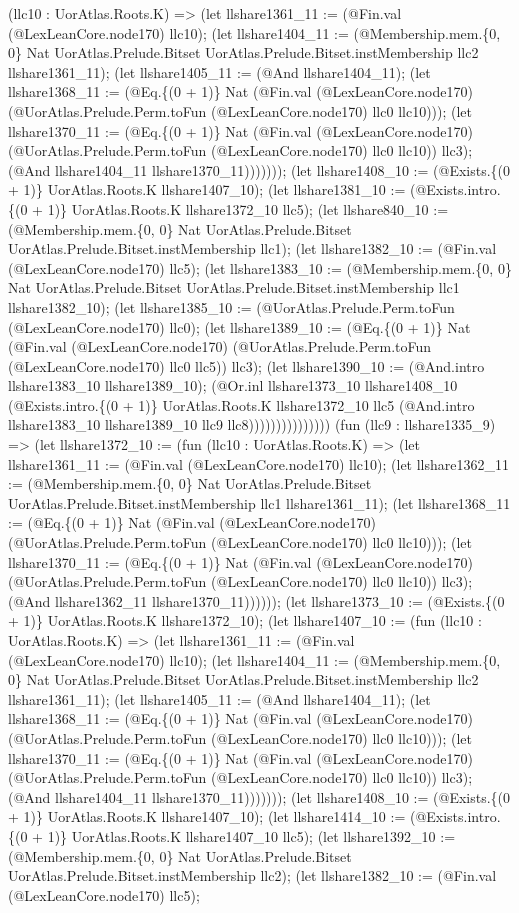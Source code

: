\documentclass[11pt]{article}
\begin{document}
(llc10 : UorAtlas.Roots.K) => (let llshare1361\_11 := (@Fin.val (@LexLeanCore.node170) llc10); (let llshare1404\_11 := (@Membership.mem.\{0, 0\} Nat UorAtlas.Prelude.Bitset UorAtlas.Prelude.Bitset.instMembership llc2 llshare1361\_11); (let llshare1405\_11 := (@And llshare1404\_11); (let llshare1368\_11 := (@Eq.\{(0 + 1)\} Nat (@Fin.val (@LexLeanCore.node170) (@UorAtlas.Prelude.Perm.toFun (@LexLeanCore.node170) llc0 llc10))); (let llshare1370\_11 := (@Eq.\{(0 + 1)\} Nat (@Fin.val (@LexLeanCore.node170) (@UorAtlas.Prelude.Perm.toFun (@LexLeanCore.node170) llc0 llc10)) llc3); (@And llshare1404\_11 llshare1370\_11))))))); (let llshare1408\_10 := (@Exists.\{(0 + 1)\} UorAtlas.Roots.K llshare1407\_10); (let llshare1381\_10 := (@Exists.intro.\{(0 + 1)\} UorAtlas.Roots.K llshare1372\_10 llc5); (let llshare840\_10 := (@Membership.mem.\{0, 0\} Nat UorAtlas.Prelude.Bitset UorAtlas.Prelude.Bitset.instMembership llc1); (let llshare1382\_10 := (@Fin.val (@LexLeanCore.node170) llc5); (let llshare1383\_10 := (@Membership.mem.\{0, 0\} Nat UorAtlas.Prelude.Bitset UorAtlas.Prelude.Bitset.instMembership llc1 llshare1382\_10); (let llshare1385\_10 := (@UorAtlas.Prelude.Perm.toFun (@LexLeanCore.node170) llc0); (let llshare1389\_10 := (@Eq.\{(0 + 1)\} Nat (@Fin.val (@LexLeanCore.node170) (@UorAtlas.Prelude.Perm.toFun (@LexLeanCore.node170) llc0 llc5)) llc3); (let llshare1390\_10 := (@And.intro llshare1383\_10 llshare1389\_10); (@Or.inl llshare1373\_10 llshare1408\_10 (@Exists.intro.\{(0 + 1)\} UorAtlas.Roots.K llshare1372\_10 llc5 (@And.intro llshare1383\_10 llshare1389\_10 llc9 llc8))))))))))))))) (fun (llc9 : llshare1335\_9) => (let llshare1372\_10 := (fun (llc10 : UorAtlas.Roots.K) => (let llshare1361\_11 := (@Fin.val (@LexLeanCore.node170) llc10); (let llshare1362\_11 := (@Membership.mem.\{0, 0\} Nat UorAtlas.Prelude.Bitset UorAtlas.Prelude.Bitset.instMembership llc1 llshare1361\_11); (let llshare1368\_11 := (@Eq.\{(0 + 1)\} Nat (@Fin.val (@LexLeanCore.node170) (@UorAtlas.Prelude.Perm.toFun (@LexLeanCore.node170) llc0 llc10))); (let llshare1370\_11 := (@Eq.\{(0 + 1)\} Nat (@Fin.val (@LexLeanCore.node170) (@UorAtlas.Prelude.Perm.toFun (@LexLeanCore.node170) llc0 llc10)) llc3); (@And llshare1362\_11 llshare1370\_11)))))); (let llshare1373\_10 := (@Exists.\{(0 + 1)\} UorAtlas.Roots.K llshare1372\_10); (let llshare1407\_10 := (fun (llc10 : UorAtlas.Roots.K) => (let llshare1361\_11 := (@Fin.val (@LexLeanCore.node170) llc10); (let llshare1404\_11 := (@Membership.mem.\{0, 0\} Nat UorAtlas.Prelude.Bitset UorAtlas.Prelude.Bitset.instMembership llc2 llshare1361\_11); (let llshare1405\_11 := (@And llshare1404\_11); (let llshare1368\_11 := (@Eq.\{(0 + 1)\} Nat (@Fin.val (@LexLeanCore.node170) (@UorAtlas.Prelude.Perm.toFun (@LexLeanCore.node170) llc0 llc10))); (let llshare1370\_11 := (@Eq.\{(0 + 1)\} Nat (@Fin.val (@LexLeanCore.node170) (@UorAtlas.Prelude.Perm.toFun (@LexLeanCore.node170) llc0 llc10)) llc3); (@And llshare1404\_11 llshare1370\_11))))))); (let llshare1408\_10 := (@Exists.\{(0 + 1)\} UorAtlas.Roots.K llshare1407\_10); (let llshare1414\_10 := (@Exists.intro.\{(0 + 1)\} UorAtlas.Roots.K llshare1407\_10 llc5); (let llshare1392\_10 := (@Membership.mem.\{0, 0\} Nat UorAtlas.Prelude.Bitset UorAtlas.Prelude.Bitset.instMembership llc2); (let llshare1382\_10 := (@Fin.val (@LexLeanCore.node170) llc5); 
\end{document}
